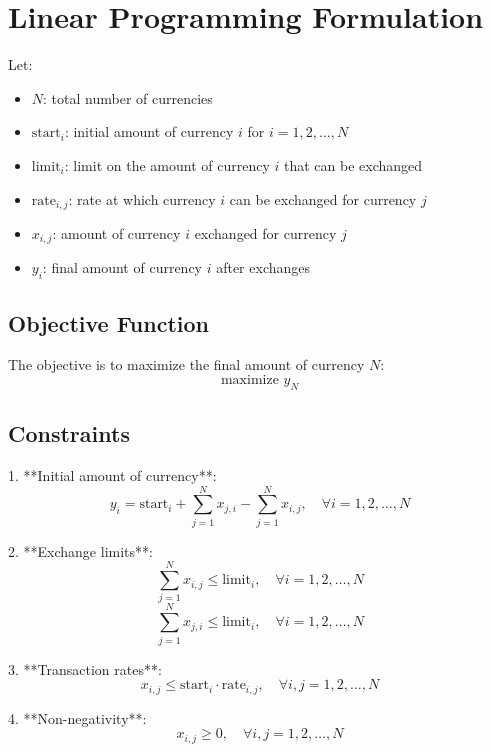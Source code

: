 \documentclass{article}
\begin{document}
\section*{Linear Programming Formulation}

Let:
\begin{itemize}
    \item \( N \): total number of currencies
    \item \( \text{start}_i \): initial amount of currency \( i \) for \( i = 1, 2, \ldots, N \)
    \item \( \text{limit}_i \): limit on the amount of currency \( i \) that can be exchanged
    \item \( \text{rate}_{i,j} \): rate at which currency \( i \) can be exchanged for currency \( j \)
    \item \( x_{i,j} \): amount of currency \( i \) exchanged for currency \( j \)
    \item \( y_i \): final amount of currency \( i \) after exchanges
\end{itemize}

\subsection*{Objective Function}
The objective is to maximize the final amount of currency \( N \):
\[
\text{maximize } y_N
\]

\subsection*{Constraints}

1. **Initial amount of currency**:
   \[
   y_i = \text{start}_i + \sum_{j=1}^{N} x_{j,i} - \sum_{j=1}^{N} x_{i,j}, \quad \forall i = 1, 2, \ldots, N
   \]

2. **Exchange limits**:
   \[
   \sum_{j=1}^{N} x_{i,j} \leq \text{limit}_i, \quad \forall i = 1, 2, \ldots, N
   \]
   \[
   \sum_{j=1}^{N} x_{j,i} \leq \text{limit}_i, \quad \forall i = 1, 2, \ldots, N
   \]

3. **Transaction rates**:
   \[
   x_{i,j} \leq \text{start}_i \cdot \text{rate}_{i,j}, \quad \forall i, j = 1, 2, \ldots, N
   \]

4. **Non-negativity**:
   \[
   x_{i,j} \geq 0, \quad \forall i, j = 1, 2, \ldots, N
   \]
\end{document}
